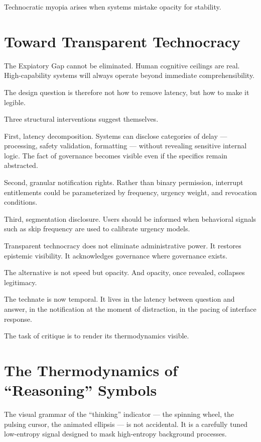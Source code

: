 \documentclass[12pt]{article}
\begin{document}
Technocratic myopia arises when systems mistake opacity for stability.

\section{Toward Transparent Technocracy}

The Expiatory Gap cannot be eliminated. Human cognitive ceilings are real. High-capability systems will always operate beyond immediate comprehensibility.

The design question is therefore not how to remove latency, but how to make it legible.

Three structural interventions suggest themselves.

First, latency decomposition. Systems can disclose categories of delay — processing, safety validation, formatting — without revealing sensitive internal logic. The fact of governance becomes visible even if the specifics remain abstracted.

Second, granular notification rights. Rather than binary permission, interrupt entitlements could be parameterized by frequency, urgency weight, and revocation conditions.

Third, segmentation disclosure. Users should be informed when behavioral signals such as skip frequency are used to calibrate urgency models.

Transparent technocracy does not eliminate administrative power. It restores epistemic visibility. It acknowledges governance where governance exists.

The alternative is not speed but opacity. And opacity, once revealed, collapses legitimacy.

The technate is now temporal. It lives in the latency between question and answer, in the notification at the moment of distraction, in the pacing of interface response.

The task of critique is to render its thermodynamics visible.

\section{The Thermodynamics of ``Reasoning'' Symbols}

The visual grammar of the ``thinking'' indicator — the spinning wheel, the pulsing cursor, the animated ellipsis — is not accidental. It is a carefully tuned low-entropy signal designed to mask high-entropy background processes.
\end{document}
